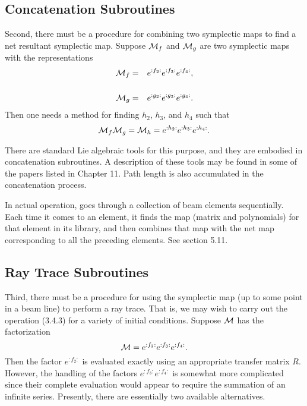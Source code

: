\subsection{Concatenation Subroutines}

     Second, there must be a procedure for combining two symplectic maps to
find a net resultant symplectic map.  Suppose ${\cal M}_f$  and ${\cal M}_g$  are two symplectic
maps with the representations
\begin{eqnarray}
       {\cal M}_f & = & e^{:f_2:} e^{:f_3:} e^{:f_4:},\\
                    &   &  \nonumber \\
       {\cal M}_g & = & e^{:g_2:} e^{:g_3:} e^{:g_4:}.
\end{eqnarray}
Then one needs a method for finding $h_2$, $h_3$, and $h_4$  such that
\begin{equation}
     {\cal M}_f {\cal M}_g = {\cal M}_h = e^{:h_2:} e^{:h_3:} e^{:h_4:}.
\end{equation}

     There are standard Lie algebraic tools for this purpose, and they are
embodied in concatenation subroutines.  A description of these tools may be
found in some of the papers listed in Chapter 11.  Path length is also
accumulated in the concatenation process.

     In actual operation, \Mary goes through a collection of beam
elements sequentially.  Each time it comes to an element, it finds the map
(matrix and polynomials) for that element in its library, and then combines
that map with the net map corresponding to all the preceding elements.
See section 5.11.

\subsection{Ray Trace Subroutines}

     Third, there must be a procedure for using the symplectic map (up to
some point in a beam line) to perform a ray trace.  That is, we may wish to
carry out the operation (3.4.3) for a variety of initial conditions.
Suppose ${\cal M}$ has the factorization
\begin{equation}
      {\cal M} = e^{:f_2:} e^{:f_3:} e^{:f_4:}.
\end{equation}
Then the factor $e^{:f_2:}$ is evaluated exactly using an appropriate
transfer matrix $R$.  However, the handling of the factors $e^{:f_3:}
e^{:f_4:}$ is somewhat more complicated since their complete evaluation
would appear to require the summation of an infinite series.  Presently,
there are essentially two available alternatives.


